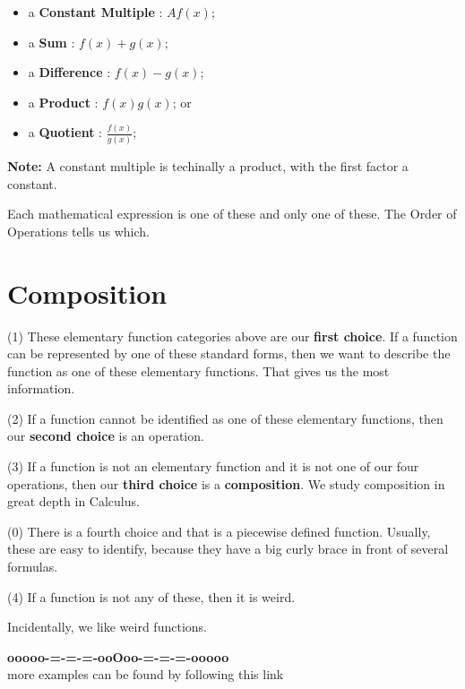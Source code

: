 \documentclass{ximera}
\begin{document}
\begin{itemize}
	\item a \textbf{Constant Multiple} : $A f(x)$;
	\item a \textbf{Sum} : $f(x) + g(x)$;
	\item a \textbf{Difference} : $f(x) - g(x)$;
	\item a \textbf{Product} : $f(x) g(x)$; or 
	\item a \textbf{Quotient} : $\frac{f(x)}{g(x)}$;
\end{itemize}

\textbf{Note:} A constant multiple is techinally a product, with the first factor a constant.

Each mathematical expression is one of these and only one of these.  The Order of Operations tells us which.













\section*{Composition}


(1) These elementary function categories above are our \textbf{first choice}.  If a function can be represented by one of these standard forms, then we want to describe the function as one of these elementary functions.  That gives us the most information. 


(2) If a function cannot be identified as one of these elementary functions, then our \textbf{second choice} is an operation. 


(3) If a function is not an elementary function and it is not one of our four operations, then our \textbf{third choice} is a \textbf{\textcolor{purple!85!blue}{composition}}.  We study composition in great depth in Calculus. 

(0) There is a fourth choice and that is a piecewise defined function.  Usually, these are easy to identify, because they have a big curly brace in front of several formulas. 

(4) If a function is not any of these, then it is weird.

Incidentally, we like weird functions.
























\begin{center}
\textbf{\textcolor{green!50!black}{ooooo-=-=-=-ooOoo-=-=-=-ooooo}} \\

more examples can be found by following this link\\ 

\end{center}
\end{document}
